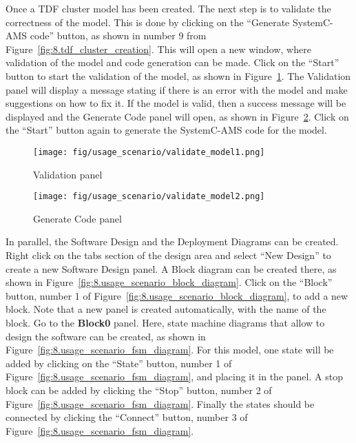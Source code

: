 Once a TDF cluster model has been created. The next step is to validate the correctness of the model. This is done by clicking on the ``Generate SystemC-AMS code'' button, as shown in number 9 from Figure~\ref{fig:8.tdf_cluster_creation}. This will open a new window, where validation of the model and code generation can be made. Click on the ``Start'' button to start the validation of the model, as shown in Figure~\ref{fig:8.validate_model1}. The Validation panel will display a message stating if there is an error with the model and make suggestions on how to fix it. If the model is valid, then a success message will be displayed and the Generate Code panel will open, as shown in Figure~\ref{fig:8.validate_model2}. Click on the ``Start'' button again to generate the SystemC-AMS code for the model. 

\begin{figure}[h]
  
         \centering
         \texttt{[image: fig/usage\_scenario/validate\_model1.png]}
         \caption{Validation panel}
         \label{fig:8.validate_model1}
     \end{figure}

\begin{figure}[h]
         \centering
         \texttt{[image: fig/usage\_scenario/validate\_model2.png]}
         \caption{Generate Code panel}
         \label{fig:8.validate_model2}
     \end{figure}
   
In parallel, the Software Design and the Deployment Diagrams can be created. Right click on the tabs section of the design area and select ``New Design'' to create a new Software Design panel. A Block diagram can be created there, as shown in Figure~\ref{fig:8.usage_scenario_block_diagram}. Click on the ``Block'' button, number 1 of Figure~\ref{fig:8.usage_scenario_block_diagram}, to add a new block. Note that a new panel is created automatically, with the name of the block. Go to the \textbf{Block0} panel. Here, state machine diagrams that allow to design the software can be created, as shown in Figure~\ref{fig:8.usage_scenario_fsm_diagram}. For this model, one state will be added by clicking on the ``State'' button, number 1 of Figure~\ref{fig:8.usage_scenario_fsm_diagram}, and placing it in the panel. 
A stop block can be added by clicking the ``Stop'' button, number 2 of Figure~\ref{fig:8.usage_scenario_fsm_diagram}. Finally the states should be connected by clicking the ``Connect'' button, number 3 of Figure~\ref{fig:8.usage_scenario_fsm_diagram}.

